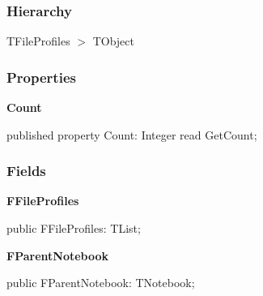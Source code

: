 \documentclass{report}
\newif\ifpdf
\begin{document}
\subsubsection*{\large{\textbf{Hierarchy}}\normalsize\hspace{1ex}\hfill}
TFileProfiles {$>$} TObject
\subsubsection*{\large{\textbf{Properties}}\normalsize\hspace{1ex}\hfill}
\begin{list}{}{
\setlength{\itemindent}{0cm}
\setlength{\listparindent}{0cm}
\setlength{\leftmargin}{\evensidemargin}
\addtolength{\leftmargin}{\tmplength}
\settowidth{\labelsep}{X}
\addtolength{\leftmargin}{\labelsep}
\setlength{\labelwidth}{\tmplength}
}
\label{editor.TFileProfiles-Count}
\item[\textbf{Count}\hfill]
\ifpdf
\begin{flushleft}
\fi
\begin{ttfamily}
published property Count: Integer read GetCount;\end{ttfamily}

\ifpdf
\end{flushleft}
\fi


\par  \end{list}
\subsubsection*{\large{\textbf{Fields}}\normalsize\hspace{1ex}\hfill}
\begin{list}{}{
\setlength{\itemindent}{0cm}
\setlength{\listparindent}{0cm}
\setlength{\leftmargin}{\evensidemargin}
\addtolength{\leftmargin}{\tmplength}
\settowidth{\labelsep}{X}
\addtolength{\leftmargin}{\labelsep}
\setlength{\labelwidth}{\tmplength}
}
\label{editor.TFileProfiles-FFileProfiles}
\item[\textbf{FFileProfiles}\hfill]
\ifpdf
\begin{flushleft}
\fi
\begin{ttfamily}
public FFileProfiles: TList;\end{ttfamily}

\ifpdf
\end{flushleft}
\fi


\par  \label{editor.TFileProfiles-FParentNotebook}
\item[\textbf{FParentNotebook}\hfill]
\ifpdf
\begin{flushleft}
\fi
\begin{ttfamily}
public FParentNotebook: TNotebook;\end{ttfamily}

\ifpdf
\end{flushleft}
\fi


\par  \end{list}
\end{document}
